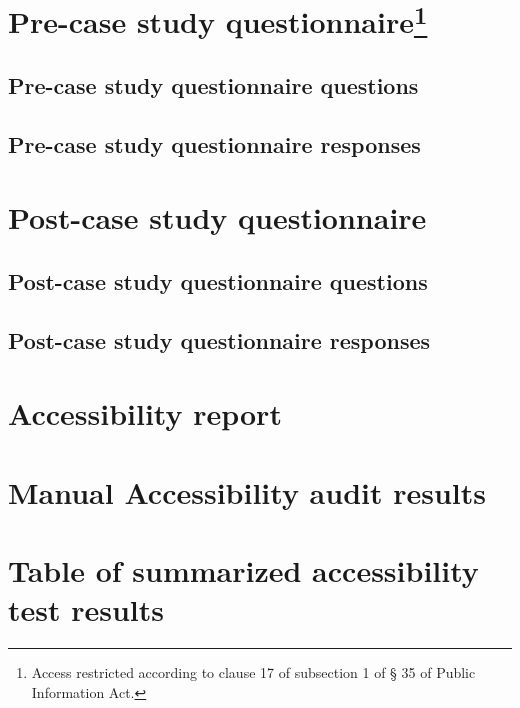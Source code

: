 \documentclass{master_thesis}
\begin{document}
\appendix

\renewcommand{\thesection}{\arabic{section}}

\section{Pre-case study questionnaire\protect\footnote[1]{Access restricted according to clause 17 of subsection 1 of § 35 of Public Information Act.}}\label{appendix:pre-survey}

\subsection{Pre-case study questionnaire questions\protect\footnotemark[1]}\label{appendix:pre-survey-questions}

\subsection{Pre-case study questionnaire responses\protect\footnotemark[1]}\label{appendix:pre-survey-responses}

\section{Post-case study questionnaire\protect\footnotemark[1]}\label{appendix:post-survey}
\subsection{Post-case study questionnaire questions\protect\footnotemark[1]}\label{appendix:post-survey-questions}

\subsection{Post-case study questionnaire responses\protect\footnotemark[1]}\label{appendix:post-survey-responses}

\section{Accessibility report\protect\footnotemark[1]}\label{appendix:report}

\section{Manual Accessibility audit results\protect\footnotemark[1]}\label{appendix:manual-audit}

\section{Table of summarized accessibility test results\protect\footnotemark[1]}\label{appendix:results-table}
\end{document}
